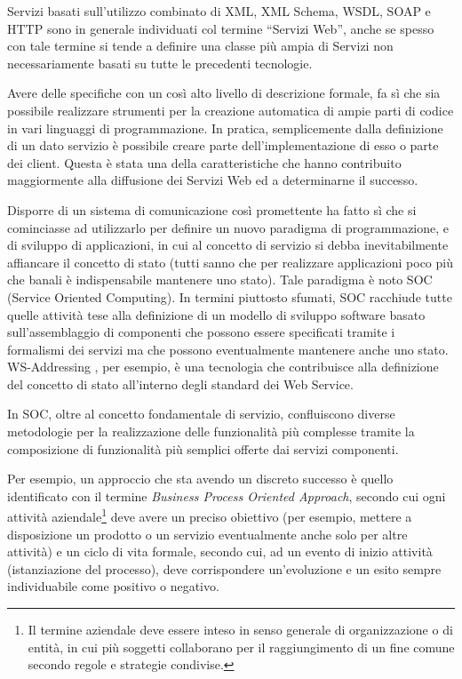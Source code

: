 Servizi basati sull'utilizzo combinato di XML, XML Schema, WSDL, SOAP e HTTP
sono in generale individuati col termine ``Servizi Web'', anche se spesso con
tale termine si tende a definire una classe più ampia di Servizi non necessariamente basati su tutte le
precedenti tecnologie.

Avere delle specifiche con un così alto livello di descrizione formale, fa sì
che sia possibile realizzare strumenti per la creazione
automatica di ampie parti di codice in vari linguaggi di programmazione. In
pratica, semplicemente dalla definizione di un dato servizio è possibile creare
parte dell'implementazione di esso o parte dei client. Questa è stata una della
caratteristiche che hanno contribuito maggiormente alla diffusione dei Servizi
Web ed a determinarne il successo.

Disporre di un sistema di comunicazione così promettente ha fatto sì che si
cominciasse ad utilizzarlo per definire un nuovo paradigma di programmazione, 
e di sviluppo di applicazioni, in cui al concetto di servizio si debba
inevitabilmente affiancare il concetto di stato (tutti sanno che per
realizzare applicazioni poco più che banali è indispensabile mantenere uno
stato). Tale paradigma è noto SOC (Service Oriented Computing).
In termini piuttosto sfumati, SOC racchiude tutte quelle attività tese alla
definizione di un modello di sviluppo software basato sull'assemblaggio di componenti che possono essere
specificati tramite i formalismi dei servizi ma che possono eventualmente
mantenere anche uno stato. WS-Addressing \cite{WS-Addressing}, per esempio, è
una tecnologia che contribuisce alla definizione del concetto di stato all'interno degli standard
dei Web Service.

In SOC, oltre al concetto fondamentale di servizio, confluiscono diverse
metodologie per la realizzazione delle funzionalità più complesse tramite la
composizione di funzionalità più semplici offerte dai servizi componenti.

Per esempio, un approccio che sta avendo un discreto successo è quello
identificato con il termine \emph{Business Process Oriented Approach}, secondo
cui ogni attività aziendale\footnote{Il termine aziendale deve essere inteso in
senso generale di organizzazione o di entità, in cui più soggetti collaborano
per il raggiungimento di un fine comune secondo regole e strategie condivise.} deve
avere un preciso obiettivo (per esempio, mettere a disposizione un prodotto o un
servizio eventualmente anche solo per altre attività) e un ciclo di vita
formale, secondo cui, ad un evento di inizio attività (istanziazione del
processo), deve corrispondere un'evoluzione e un esito sempre individuabile
come positivo o negativo.

